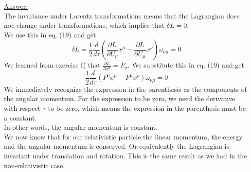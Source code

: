 \documentclass[11pt,a4paper]{report}
\newcommand{\pfrac}[2]{\frac{\partial #1}{\partial #2}}
\newcounter{excount}[chapter]
\newenvironment{exercise}[1][]{\addtocounter{excount}{1} \noindent {\bf Question
    \arabic{excount} \ \ #1}\hspace{2mm}}{\vspace{4mm}}
\begin{document}
\begin{exercise}{\bf A (boring) Lagrangian\\}
\begin{itemize}
\underline{Answer:}\\
The invariance under Lorentz transformations means that the Lagrangian does noe change under transformations, which implies that $\delta L = 0$.\\
We use this in eq. (19) and get 
\begin{equation}
\delta L = \frac{1}{2} \frac{d}{d\tau}\left (\pfrac{L}{U_{\nu}}x^{\mu} - \pfrac{L}{U_{\mu}}x^{\nu}\right )\omega_{\nu\mu} = 0
\end{equation}
We learned from exercise f) that $\pfrac{L}{x^{\sigma}} = P_\sigma$. We substitute this in eq. (19) and get
\begin{equation}
\frac{1}{2} \frac{d}{d\tau}\left (P^{\nu}x^{\mu} - P^{\mu}x^{\nu}\right )\omega_{\nu\mu} = 0
\end{equation}
We immediately recognize the expression in the parenthesis as the components of the angular momentum. For the expression to be zero, we need the derivative with respect $\tau$ to be zero, which means the expression in the parenthesis must be a constant.\\
In other words, the angular momentum is constant.\\

We now know that for our relativistic particle the linear momentum, the energy and the angular momentum is conserved. Or equivalently the Lagrangian is invariant under translation and rotation. This is the same result as we had in the non-relativistic case.

\end{itemize}
\end{exercise}
\end{document}
